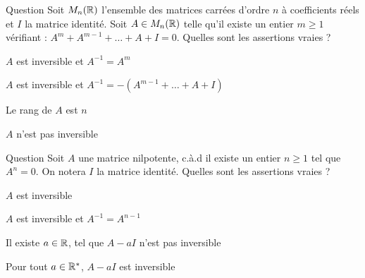 \begin{multi}[multiple,feedback=
{De l'égalité : \(A \times  (A^{m-1}+A^{m-2}+ \dots + I)= -I\), on déduit que  \(A\) est inversible et que \(A^{-1}=-(A^{m-1}+ \dots + A+I)=A^m\). Puisque \(A\) est inversible, le rang de \(A\) est \(n\).
}]{Question}
Soit \( M_n(\mathbb{R})\) l'ensemble des matrices carrées d'ordre \(n\)  à coefficients réels  et \(I\) la matrice identité.
Soit \(A \in M_n(\mathbb{R})\) telle qu'il existe un entier  \(m \ge 1\) vérifiant :  \(A^m+A^{m-1}+ \dots + A + I = 0\). Quelles sont les assertions vraies ?

    \item* \(A\) est inversible et \(A^{-1} = A^m\)
    \item* \(A\) est inversible et \(A^{-1} = -(A^{m-1}+ \dots + A+I)\)
    \item* Le rang de \(A\) est \(n\)
    \item \(A\) n'est pas inversible
\end{multi}


\begin{multi}[multiple,feedback=
{On suppose que \(A\) est inversible, alors \(A\) est non nul et il existe une matrice \(C\) telle que \(AC=I\). 
Soit \(m\) le plus petit entier \(\ge 1\) tel que \(A^m=0\). Alors, \(0=A^mC=A^{m-1}(AC)=A^{m-1}\), ce qui est absurde.
Par conséquent, \(A\) n'est pas inversible.\\
Comme \(A\) n'est pas inversible, pour \(a=0\), \(A-aI\) n'est pas inversible.\\
Soit \(a\in \Rr^*\), de l'égalité : \((A-aI)(a^{n-1}I+a^{n-2}A+\dots + aA^{n-2}+A^{n-1})=A^n-a^nI=-a^nI\), on déduit que 
\(A-aId\) est inversible et que 
\(\displaystyle (A-aId)^{-1}=-\frac{1}{a^n}\left(a^{n-1}I+a^{n-2}A+\dots + aA^{n-2}+A^{n-1}\right)\).
}]{Question}
Soit \(A\) une matrice nilpotente, c.à.d il existe un entier \(n\ge 1\) tel que \(A^n=0\). On notera \(I\) la matrice identité. Quelles sont les assertions vraies ?

    \item \(A\) est inversible
    \item \(A\) est inversible et \(A^{-1} = A^{n-1}\)
    \item* Il existe \(a\in \mathbb{R}\), tel que \(A-aI\) n'est pas inversible
    \item* Pour tout \(a\in \Rr^*\), \(A-aI\) est inversible
\end{multi}
